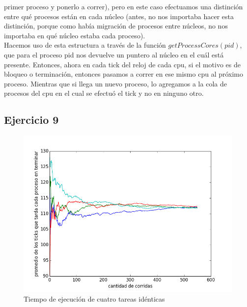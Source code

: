 \documentclass[a4paper]{article}
\begin{document}
primer proceso y ponerlo a correr), pero en este caso efectuamos una distinci\'on entre qu\'e procesos est\'an en cada
n\'ucleo (antes, no nos importaba hacer esta distinci\'on, porque como hab\'ia migraci\'on de procesos entre 
n\'ucleos, no nos importaba en qu\'e n\'ucleo estaba cada proceso). \\
Hacemos uso de esta estructura a trav\'es de la funci\'on $getProcessCores(pid)$, que para 
el proceso pid nos devuelve un puntero al n\'ucleo en el cu\'al est\'a presente. Entonces, ahora
en cada tick del reloj de cada cpu, si el motivo es de bloqueo o terminaci\'on, entonces pasamos a correr en ese mismo
cpu al pr\'oximo proceso. Mientras que si llega un nuevo proceso, lo agregamos a la cola de procesos del cpu
en el cual se efectu\'o el tick y no en ninguno otro. \\
\newpage
\subsection{Ejercicio 9}

\begin{figure}[H]
\centering
\includegraphics[scale=0.66]{../experimentacion/ej9-fairness/tiempo_final/prueba-tiempo-final.png}
\caption{Tiempo de ejecución de cuatro tareas idénticas}
\end{figure}
\end{document}
